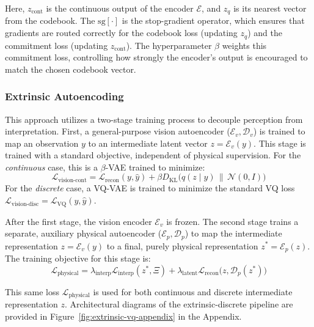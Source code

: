 \documentclass[nonacm,sigconf]{acmart}
\begin{document}
Here, \(z_{\text{cont}}\) is the continuous output of the encoder \(\mathcal{E}\), and \(z_q\) is its nearest vector from the codebook. The \(\text{sg}[\cdot]\) is the stop-gradient operator, which ensures that gradients are routed correctly for the codebook loss (updating \(z_q\)) and the commitment loss (updating \(z_{\text{cont}}\)). The hyperparameter \(\beta\) weights this commitment loss, controlling how strongly the encoder's output is encouraged to match the chosen codebook vector.


\subsubsection{Extrinsic Autoencoding}


This approach utilizes a two-stage training process to decouple perception from interpretation.
First, a general-purpose vision autoencoder (\(\mathcal{E}_v, \mathcal{D}_v\)) is trained to map an observation \(y\) to an intermediate latent vector \(z = \mathcal{E}_v(y)\). This stage is trained with a standard objective, independent of physical supervision.
For the \textit{continuous} case, this is a \(\beta\)-VAE trained to minimize:
\begin{equation}
    \mathcal{L}_{\text{vision-cont}} = \mathcal{L}_{\text{recon}}(y, \hat{y}) + \beta D_{\text{KL}}\big(q(z \mid y) \,\|\, \mathcal{N}(0, I)\big)
\end{equation}
For the \textit{discrete} case, a VQ-VAE is trained to minimize the standard VQ loss \(\mathcal{L}_{\text{vision-disc}} = \mathcal{L}_{\text{VQ}}(y, \hat{y})\).


After the first stage, the vision encoder \(\mathcal{E}_v\) is frozen. The second stage trains a separate, auxiliary {physical autoencoder} (\(\mathcal{E}_p, \mathcal{D}_p\)) to map the intermediate representation \(z = \mathcal{E}_v(y)\) to a final, purely physical representation \(z^* = \mathcal{E}_p(z)\). The training objective for this stage is:
\begin{equation}
    \mathcal{L}_{\text{physical}} = \lambda_{\text{interp}}\mathcal{L}_{\text{interp}}(z^*, \Xi) + \lambda_{\text{latent}}\mathcal{L}_{\text{recon}}\big(z,  \mathcal{D}_p(z^*))
\end{equation}

This same loss \(\mathcal{L}_{\text{physical}}\) is used for both continuous and discrete intermediate representation \(z\). Architectural diagrams of the extrinsic-discrete pipeline are provided in Figure~\ref{fig:extrinsic-vq-appendix} in the Appendix.
\end{document}
